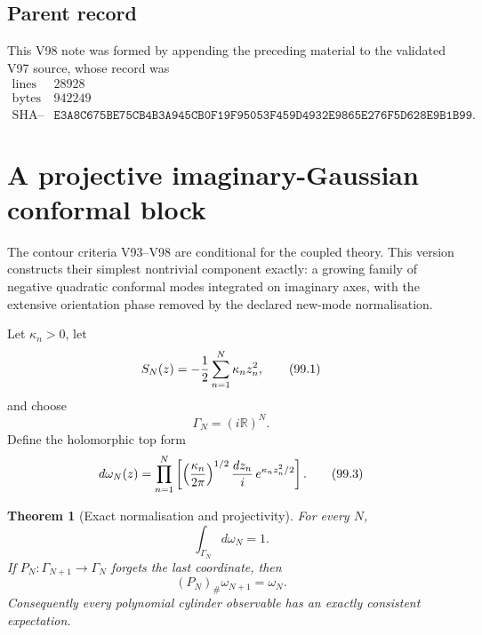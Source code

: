 \documentclass[11pt]{article}
\newtheorem{theorem}{Theorem}[section]
\begin{document}
\subsection{Parent record}

This V98 note was formed by appending the preceding material to the
validated V97 source, whose record was
\[
\begin{array}{c|c}
\text{lines}&28928\\
\text{bytes}&942249\\
\text{SHA--256}&
\texttt{E3A8C675BE75CB4B3A945CB0F19F95053F459D4932E9865E276F5D628E9B1B99}.
\end{array}                                                     \tag{98.20}
\]


\section{A projective imaginary-Gaussian conformal block}
\label{sec:v11v99}

The contour criteria V93--V98 are conditional for the coupled theory.
This version constructs their simplest nontrivial component exactly:
a growing family of negative quadratic conformal modes integrated on
imaginary axes, with the extensive orientation phase removed by the
declared new-mode normalisation.

Let \(\kappa_n>0\), let
\[
                              S_N(z)
                              =-{1\over2}\sum_{n=1}^N
                                      \kappa_n z_n^2,        \tag{99.1}
\]
and choose
\[
                              \Gamma_N=(i\mathbb R)^N.       \tag{99.2}
\]
Define the holomorphic top form
\[
 d\omega_N(z)
 =\prod_{n=1}^N
   \left[
    \left({\kappa_n\over2\pi}\right)^{1/2}
       {dz_n\over i}\,
       e^{\kappa_n z_n^2/2}
   \right].                                                  \tag{99.3}
\]

\begin{theorem}[Exact normalisation and projectivity]
\label{thm:v11v99-gaussian}
For every \(N\),
\[
                              \int_{\Gamma_N}d\omega_N=1.    \tag{99.4}
\]
If \(P_N:\Gamma_{N+1}\to\Gamma_N\) forgets the last coordinate, then
\[
                              (P_N)_\#\omega_{N+1}=\omega_N. \tag{99.5}
\]
Consequently every polynomial cylinder observable has an exactly
consistent expectation.
\end{theorem}
\end{document}
